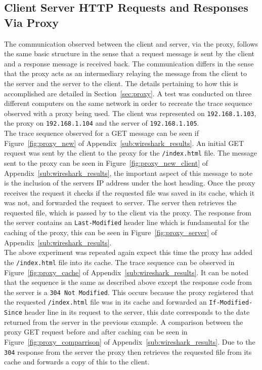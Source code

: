 \documentclass[10pt,twocolumn]{witseiepaper}
\begin{document}
	 \subsection{Client Server HTTP Requests and Responses Via Proxy}	
	 
		 The communication observed between the client and server, via the proxy, follows the same basic structure in the sense that a request message is sent by the client and a response message is received back. The communication differs in the sense that the proxy acts as an intermediary relaying the message from the client to the server and the server to the client. The details pertaining to how this is accomplished are detailed in Section~\ref{sec:proxy}. A test was conducted on three different computers on the same network in order to recreate the trace sequence observed with a proxy being used. The client was represented on \texttt{192.168.1.103}, the proxy on \texttt{192.168.1.104} and the server of \texttt{192.168.1.105}. \\
		 
		 The trace sequence observed for a GET message can be seen if Figure~\ref{fig:proxy_new} of Appendix~\ref{sub:wireshark_results}. An initial GET request was sent by the client to the proxy for the \texttt{/index.html} file. The message sent to the proxy can be seen in Figure~\ref{fig:proxy_new_client} of Appendix~\ref{sub:wireshark_results}, the important aspect of this message to note is the inclusion of the servers IP address under the host heading. Once the proxy receives the request it checks if the requested file was saved in its cache, which it was not, and forwarded the request to server. The server then retrieves the requested file, which is passed by to the client via the proxy. The response from the server contains an \texttt{Last-Modified} header line which is fundamental for the caching of the proxy, this can be seen in Figure~\ref{fig:proxy_server} of Appendix~\ref{sub:wireshark_results}. \\
		 
		 The above experiment was repeated again expect this time the proxy has added the \texttt{/index.html} file into its cache. The trace sequence can be observed in Figure~\ref{fig:proxy_cache} of Appendix~\ref{sub:wireshark_results}. It can be noted that the sequence is the same as described above except the response code from the server is a \texttt{304 Not Modified}. This occurs because the proxy registered that the requested \texttt{/index.html} file was in its cache and forwarded an \texttt{If-Modified-Since} header line in its request to the server, this date corresponds to the date returned from the server in the previous example. A comparison between the proxy GET request before and after caching can be seen in Figure~\ref{fig:proxy_comparrison} of Appendix~\ref{sub:wireshark_results}. Due to the \texttt{304} response from the server the proxy then retrieves the requested file from its cache and forwards a copy of this to the client.
	
\end{document}
